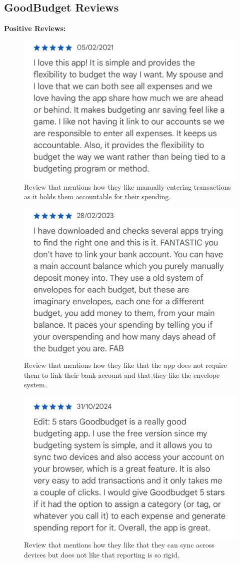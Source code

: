 \documentclass{l4proj}
\begin{document}
\begin{appendices}
\section{GoodBudget Reviews}
\textbf{Positive Reviews:}
\begin{figure}[H]
    \centering
    \includegraphics[width=0.5\linewidth]{images/App-Comparison/goodbudget-pos-1.png}
    \caption{Review that mentions how they like manually entering transactions as it holds them accountable for their spending.}
    \label{fig:enter-label}
\end{figure}
\begin{figure}[H]
    \centering
    \includegraphics[width=0.5\linewidth]{images/App-Comparison/goodbudget-pos-2.png}
    \caption{Review that mentions how they like that the app does not require them to link their bank account and that they like the envelope system.}
    \label{fig:enter-label}
\end{figure}
\begin{figure}[H]
    \centering
    \includegraphics[width=0.5\linewidth]{images/App-Comparison/goodbudget-pos-3.png}
    \caption{Review that mentions how they like that they can sync across devices but does not like that reporting is so rigid.}
    \label{fig:enter-label}
\end{figure}


\end{appendices}
\end{document}
